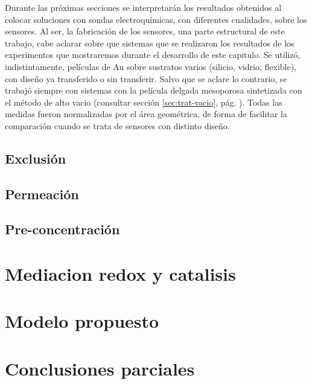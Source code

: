 	Durante las próximas secciones se interpretarán los resultados obtenidos al colocar soluciones con sondas electroquímicas, con diferentes cualidades, sobre los sensores. Al ser,  la fabricación de los sensores, una parte estructural de este trabajo, cabe aclarar sobre que sistemas que se realizaron los resultados de los experimentos que mostraremos durante el desarrollo de este capitulo. Se utilizó, indistintamente, películas de Au sobre sustratos varios (silicio, vidrio, flexible), con diseño ya transferido o sin transferir. Salvo que se aclare lo contrario, se trabajó siempre con sistemas con la película delgada mesoporosa sintetizada con el método de alto vacio (consultar sección \ref{sec:trat-vacio}, pág. \pageref{sec:trat-vacio}). Todas las medidas fueron normalizadas por el área geométrica, de forma de facilitar la comparación cuando se trata de sensores con distinto diseño.  

	\subsection{Exclusión}

	\subsection{Permeación}

	\subsection{Pre-concentración}

\section{Mediacion redox y catalisis}

\section{Modelo propuesto}

\section{Conclusiones parciales}


